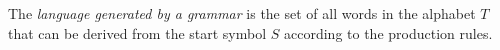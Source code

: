 

\setcounter{section}{5}
\setcounter{subsection}{1}
\setcounter{dfn}{3}

\begin{dfn}
The \emph{language generated by a grammar} is the set of all words in the alphabet $T$ that can be derived from the start symbol $S$
according to the production rules.
\end{dfn}

